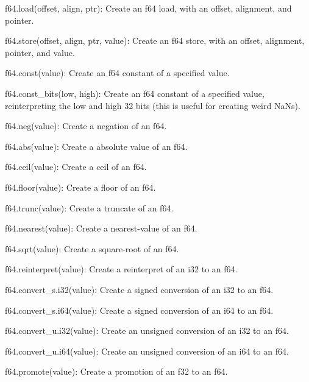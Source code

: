 \begin{DoxyItemize}
\begin{DoxyItemize}
\item {\ttfamily f64.\+load(offset, align, ptr)}\+: Create an {\ttfamily f64} load, with an offset, alignment, and pointer.
\item {\ttfamily f64.\+store(offset, align, ptr, value)}\+: Create an {\ttfamily f64} store, with an offset, alignment, pointer, and value.
\item {\ttfamily f64.\+const(value)}\+: Create an {\ttfamily f64} constant of a specified value.
\item {\ttfamily f64.\+const\+\_\+bits(low, high)}\+: Create an {\ttfamily f64} constant of a specified value, reinterpreting the low and high 32 bits (this is useful for creating weird Na\+Ns).
\item {\ttfamily f64.\+neg(value)}\+: Create a negation of an {\ttfamily f64}.
\item {\ttfamily f64.\+abs(value)}\+: Create a absolute value of an {\ttfamily f64}.
\item {\ttfamily f64.\+ceil(value)}\+: Create a ceil of an {\ttfamily f64}.
\item {\ttfamily f64.\+floor(value)}\+: Create a floor of an {\ttfamily f64}.
\item {\ttfamily f64.\+trunc(value)}\+: Create a truncate of an {\ttfamily f64}.
\item {\ttfamily f64.\+nearest(value)}\+: Create a nearest-\/value of an {\ttfamily f64}.
\item {\ttfamily f64.\+sqrt(value)}\+: Create a square-\/root of an {\ttfamily f64}.
\item {\ttfamily f64.\+reinterpret(value)}\+: Create a reinterpret of an {\ttfamily i32} to an {\ttfamily f64}.
\item {\ttfamily f64.\+convert\+\_\+s.\+i32(value)}\+: Create a signed conversion of an {\ttfamily i32} to an {\ttfamily f64}.
\item {\ttfamily f64.\+convert\+\_\+s.\+i64(value)}\+: Create a signed conversion of an {\ttfamily i64} to an {\ttfamily f64}.
\item {\ttfamily f64.\+convert\+\_\+u.\+i32(value)}\+: Create an unsigned conversion of an {\ttfamily i32} to an {\ttfamily f64}.
\item {\ttfamily f64.\+convert\+\_\+u.\+i64(value)}\+: Create an unsigned conversion of an {\ttfamily i64} to an {\ttfamily f64}.
\item {\ttfamily f64.\+promote(value)}\+: Create a promotion of an {\ttfamily f32} to an {\ttfamily f64}.

\end{DoxyItemize}
\end{DoxyItemize}
